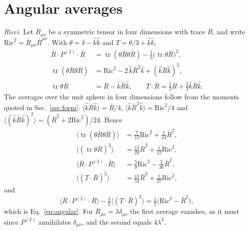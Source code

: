 \documentclass[aps,prd,10pt,twocolumn,superscriptaddress,nofootinbib,floatfix,longbibliography]{revtex4-2}
\newcommand{\Pt}{P^{(2)}}
\newcommand{\Ric}{\mathrm{Ric}}
\begin{document}
\section{Angular averages}
\label{app:angular}

\textit{Ricci.} Let $\bar R_{\mu\nu}$ be a symmetric tensor in four dimensions with trace $\bar R$, and write $\Ric^2=\bar R_{\mu\nu}\bar R^{\mu\nu}$. With $\theta=\delta-\hat k\hat k$ and $T=\theta/3+\hat k\hat k$,
\begin{align*}
\bar R\cdot\Pt\cdot\bar R&=\operatorname{tr}(\theta\bar R\theta\bar R)-\tfrac13\bigl(\operatorname{tr}\theta\bar R\bigr)^2,\\
\operatorname{tr}(\theta\bar R\theta\bar R)&=\Ric^2-2\,\hat k\bar R^2\hat k+(\hat k\bar R\hat k)^2,\\
\operatorname{tr}\theta\bar R&=\bar R-\hat k\bar R\hat k,\qquad T\cdot\bar R=\tfrac13\bar R+\tfrac23\hat k\bar R\hat k .
\end{align*}
The averages over the unit sphere in four dimensions follow from the moments quoted in Sec.~\ref{sec:form}: $\langle\hat k\bar R\hat k\rangle=\bar R/4$, $\langle\hat k\bar R^2\hat k\rangle=\Ric^2/4$ and $\langle(\hat k\bar R\hat k)^2\rangle=(\bar R^2+2\Ric^2)/24$. Hence
\begin{align*}
\langle\operatorname{tr}(\theta\bar R\theta\bar R)\rangle&=\tfrac7{12}\Ric^2+\tfrac1{24}\bar R^2,\\
\langle(\operatorname{tr}\theta\bar R)^2\rangle&=\tfrac{13}{24}\bar R^2+\tfrac1{12}\Ric^2,\\
\langle\bar R\cdot\Pt\cdot\bar R\rangle&=\tfrac59\Ric^2-\tfrac5{36}\bar R^2,\\
\langle(T\cdot\bar R)^2\rangle&=\tfrac{13}{54}\bar R^2+\tfrac1{27}\Ric^2,
\end{align*}
and
\[
\langle\bar R\cdot\Pt\cdot\bar R\rangle-\tfrac32\langle(T\cdot\bar R)^2\rangle=\tfrac12\bigl(\Ric^2-\bar R^2\bigr),
\]
which is Eq.~\eqref{eq:angular}. For $\bar R_{\mu\nu}=\lambda\delta_{\mu\nu}$ the first average vanishes, as it must since $\Pt$ annihilates $\delta_{\mu\nu}$, and the second equals $4\lambda^2$.
\end{document}
